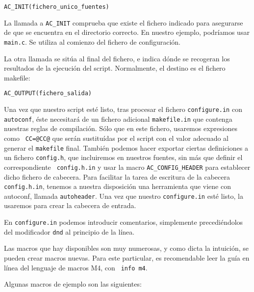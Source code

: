 \begin{verbatim}
AC_INIT(fichero_unico_fuentes)
\end{verbatim}

La llamada a  {\tt AC\_INIT} comprueba que existe  el fichero indicado
para  asegurarse de  que se  encuentra en  el directorio  correcto. En
nuestro ejemplo, podríamos  usar {\tt main.c}. Se  utiliza al comienzo
del fichero de configuración.

La  otra llamada  se sitúa  al final  del fichero,  e indica  dónde se
recogeran los resultados  de la ejecución del  script. Normalmente, el
destino es el fichero {makefile}:

\begin{verbatim}
AC_OUTPUT(fichero_salida)
\end{verbatim}

Una  vez que  nuestro  script  esté listo,  tras  procesar el  fichero
{\tt  configure.in}   con  {\tt  autoconf},  éste   necesitará  de  un
fichero adicional  {\tt makefile.in}  que contenga nuestras  reglas de
compilación. Sólo que en este  fichero, usaremos expresiones como {\tt
CC=@CC@} que serán sustituídas por el  script con el valor adecuado al
generar  el  {\tt  makefile}  final. También  podemos  hacer  exportar
ciertas  definiciones a  un  fichero {\tt  config.h}, que  incluiremos
en  nuestros fuentes,  sin  más que  definir  el correspondiente  {\tt
config.h.in} y usar la  macro {\tt AC\_CONFIG\_HEADER} para establecer
dicho fichero  de cabecera.  Para facilitar la  tarea de  escritura de
la  cabecera  {\tt config.h.in},  tenemos  a  nuestra disposición  una
herramienta que viene con autoconf,  llamada {\tt autoheader}. Una vez
que nuestro {\tt  configure.in} esté listo, la usaremos  para crear la
cabecera de entrada.

En  {\tt  configure.in}  podemos introducir  comentarios,  simplemente
precediéndolos del modificador {\tt dnd} al principio de la línea.

Las macros  que hay  disponibles son  muy numerosas,  y como  dicta la
intuición, se  pueden crear  macros nuevas.  Para este  particular, es
recomendable leer la guía en línea del lenguaje de macros M4, con {\tt
info m4}.

Algunas macros de ejemplo son las siguientes:

